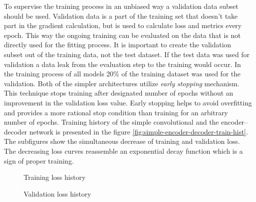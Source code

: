 To supervise the training process in an unbiased way a validation data subset should be used.
Validation data is a part of the training set that doesn't take part in the gradient calculation, but is used to calculate loss and metrics every epoch.
This way the ongoing training can be evaluated on the data that is not directly used for the fitting process.
It is important to create the validation subset out of the training data, not the test dataset.
If the test data was used for validation a data leak from the evaluation step to the training would occur.
In the training process of all models 20\% of the training dataset was used for the validation.
Both of the simpler architectures utilize \textit{early stopping} mechanism.
This technique stops training after designated number of epochs without an improvement in the validation loss value.
Early stopping helps to avoid overfitting and provides a more rational stop condition than training for an arbitrary number of epochs.
Training history of the simple convolutional and the encoder--decoder network is presented in the figure \ref{fig:simple-encoder-decoder-train-hist}.
The subfigures show the simultaneous decrease of training and validation loss.
The decreasing loss curves reassemble an exponential decay function which is a sign of proper training.
\begin{sidewaysfigure}
    \begin{subfigure}{0.5\textwidth}
    \hfill
        \centering
        \caption{Training loss history}
    \end{subfigure}
    \hfill
    \begin{subfigure}{0.5\textwidth}
        \centering
        \caption{Validation loss history}
    \end{subfigure}
    \hfill
    \caption{Training history of the simple convolutional and encoder--decoder netowrks}
    \label{fig:simple-encoder-decoder-train-hist}
\end{sidewaysfigure}

